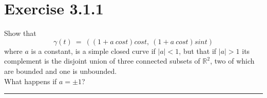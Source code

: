 \documentclass[12pt]{article}
\begin{document}
\maketitle

\section*{Exercise 3.1.1}
Show that\\
$$ \gamma(t) \ = \ ((1+a \ cost)cost, \ (1+a \ cost)sint) $$
where $a$ is a constant, is a simple closed curve if $|a| < 1$, but that if $|a|>1$ its complement is the disjoint union of three connected subsets of $\mathbb{R}^2$, two of which are bounded and one is unbounded.\\
What happens if $a = \pm1$?

\vspace{1cm}
\hrule
\vspace{1cm}
\end{document}
